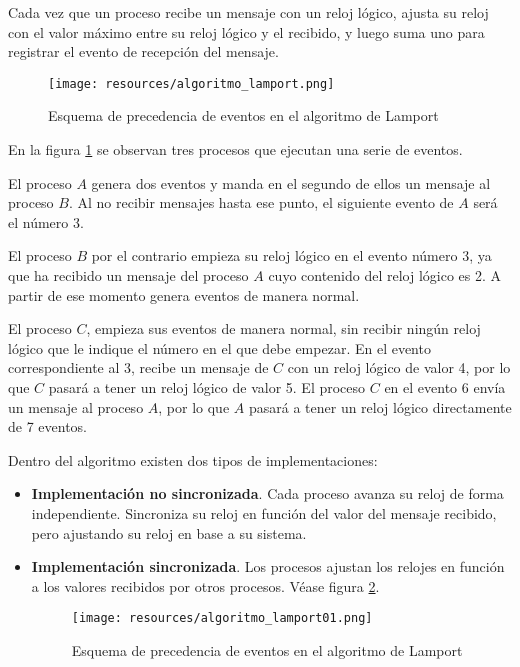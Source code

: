 \documentclass[a4paper, 11pt, titlepage]{article}
\begin{document}
            Cada vez que un proceso recibe un mensaje con un reloj lógico, ajusta su reloj con el valor máximo entre su reloj lógico y el recibido, y luego suma uno para registrar el evento de recepción del mensaje.

            \begin{figure}[htp]
                \centering
                \texttt{[image: resources/algoritmo\_lamport.png]}
                \caption{Esquema de precedencia de eventos en el algoritmo de Lamport}
                \label{algoritmo_lamport}
            \end{figure}
    
            En la figura \ref{algoritmo_lamport} se observan tres procesos que ejecutan una serie de eventos.

            El proceso $A$ genera dos eventos y manda en el segundo de ellos un mensaje al proceso $B$. Al 
            no recibir mensajes hasta ese punto, el siguiente evento de $A$ será el número 3.

            El proceso $B$ por el contrario empieza su reloj lógico en el evento número 3, ya que ha 
            recibido un mensaje del proceso $A$ cuyo contenido del reloj lógico es 2. A partir de ese 
            momento genera eventos de manera normal.

            El proceso $C$, empieza sus eventos de manera normal, sin recibir ningún reloj lógico que le 
            indique el número en el que debe empezar. En el evento correspondiente al 3, recibe un mensaje 
            de $C$ con un reloj lógico de valor 4, por lo que $C$ pasará a tener un reloj lógico de valor 
            5. El proceso $C$ en el evento 6 envía un mensaje al proceso $A$, por lo que $A$ pasará a 
            tener un reloj lógico directamente de 7 eventos.

            Dentro del algoritmo existen dos tipos de implementaciones:

            \begin{itemize}
                \item \textbf{Implementación no sincronizada}. Cada proceso avanza su reloj de forma independiente.
                Sincroniza su reloj en función del valor del mensaje recibido, pero ajustando su reloj en base a su 
                sistema.
                \item \textbf{Implementación sincronizada}. Los procesos ajustan los relojes en función a los valores 
                recibidos por otros procesos. Véase figura \ref{algoritmo_lamport01}.
                
                \begin{figure}[htp]
                    \centering
                    \texttt{[image: resources/algoritmo\_lamport01.png]}
                    \caption{Esquema de precedencia de eventos en el algoritmo de Lamport}
                    \label{algoritmo_lamport01}
                \end{figure}
            \end{itemize}
\end{document}
